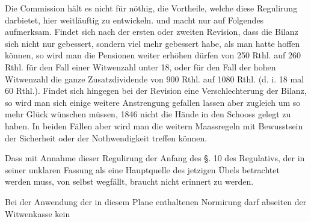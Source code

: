 Die Commission hält es nicht für nöthig, die Vortheile, welche diese Regulirung darbietet, hier weitläuftig zu entwickeln. und macht nur auf Folgendes aufmerksam. Findet sich nach der ersten oder zweiten Revision, dass die Bilanz sich nicht nur gebessert, sondern viel mehr gebessert habe, als man hatte hoffen können, so wird man die Pensionen weiter erhöhen dürfen von 250 Rthl. auf 260 Rthl. für den Fall einer Witwenzahl unter 18, oder für den Fall der hohen Witwenzahl die ganze Zusatzdividende von 900 Rthl. auf 1080 Rthl. (d. i. 18 mal 60 Rthl.). Findet sich hingegen bei der Revision eine Verschlechterung der Bilanz, so wird man sich einige weitere Anstrengung gefallen lassen aber zugleich um so mehr Glück wünschen müssen, 1846 nicht die Hände in den Schooss gelegt zu haben. In beiden Fällen aber wird man die weitern Maassregeln mit Bewusstsein der Sicherheit oder der Nothwendigkeit treffen können.

Dass mit Annahme dieser Regulirung der Anfang des §. 10 des Regulativs, der in seiner unklaren Fassung als eine Hauptquelle des jetzigen Übels betrachtet werden muss, von selbst wegfällt, braucht nicht erinnert zu werden.

Bei der Anwendung der in diesem Plane enthaltenen Normirung darf abseiten der Witwenkasse kein
